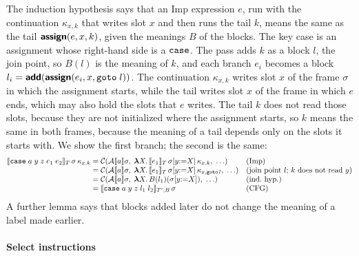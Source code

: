 The induction hypothesis says that an Imp expression $e$, run with the
continuation $\kappa_{x,k}$ that writes slot $x$ and then runs the tail
$k$, means the same as the tail $\textsf{\bfseries assign}(e, x, k)$, given the
meanings $B$ of the blocks. The key case is an assignment whose
right-hand side is a $\mathtt{case}$. The pass adds $k$ as a block $l$, the
join point, so $B(l)$ is the meaning of $k$, and each branch $e_i$
becomes a block $l_i = \textsf{\bfseries add}(\textsf{\bfseries assign}(e_i, x, \mathtt{goto}\;l))$.
The continuation $\kappa_{x,k}$ writes slot $x$ of the frame $\sigma$
in which the assignment starts, while the tail writes slot $x$ of the
frame in which $e$ ends, which may also hold the slots that $e$ writes.
The tail $k$ does not read those slots, because they are not
initialized where the assignment starts, so $k$ means the same in both
frames, because the meaning of a tail depends only on the slots it
starts with.
We show the first branch; the second is the same:
{\small
\[
\begin{array}{@{}r@{\;}c@{\;}l@{\quad}l@{}}
  \den{\kw{case}\;a\;y\;z\;e_1\;e_2}_T\,\sigma\,\kappa_{x,k}
    & = & \mathcal{C}(\mathcal{A}\den{a}\sigma,\; \mlam{X} \den{e_1}_T\,\sigma[y{:=}X]\,\kappa_{x,k},\; \ldots) & \text{(Imp)}\\
    & = & \mathcal{C}(\mathcal{A}\den{a}\sigma,\; \mlam{X} \den{e_1}_T\,\sigma[y{:=}X]\,\kappa_{x,\kw{goto}\,l},\; \ldots) & \text{(join point $l$; $k$ does not read $y$)}\\
    & = & \mathcal{C}(\mathcal{A}\den{a}\sigma,\; \mlam{X} B(l_1)(\sigma[y{:=}X]),\; \ldots) & \text{(ind.\ hyp.)}\\
    & = & \den{\kw{case}\;a\;y\;z\;l_1\;l_2}_{T',B}\,\sigma & \text{(CFG)}
\end{array}
\]}
A further lemma says that blocks added later do not change the meaning
of a label made earlier.

\paragraph{Select instructions}

